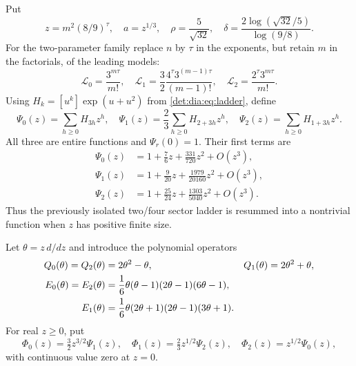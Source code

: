 \documentclass[11pt,letterpaper]{article}
\numberwithin{equation}{section}
\theoremstyle{definition}\newtheorem{definition}[theorem]{Definition}
\theoremstyle{remark}\newtheorem{remark}[theorem]{Remark}
\newcommand{\coef}[2]{[#1^{#2}]}
\begin{document}
Put
\begin{equation}\label{det:dia:eq:crossparams}
 z=m^2(8/9)^\tau,\quad a=z^{1/3},\quad
 \rho=\frac5{\sqrt{32}},\quad
 \delta=\frac{2\log(\sqrt{32}/5)}{\log(9/8)}.
\end{equation}
For the two-parameter family replace $n$ by $\tau$ in the exponents,
but retain $m$ in the factorials, of the leading models:
\begin{equation}\label{det:dia:eq:crossL}
 \mathcal L_0=\frac{3^{m\tau}}{m!},\quad
 \mathcal L_1=\frac32\frac{4^\tau3^{(m-1)\tau}}{(m-1)!},\quad
 \mathcal L_2=\frac{2^\tau3^{m\tau}}{m!}.
\end{equation}
Using $H_k=\coef{u}{k}\exp(u+u^2)$ from \eqref{det:dia:eq:ladder}, define
\begin{equation}\label{det:dia:eq:Psi}
 \Psi_0(z)=\sum_{h\geq0}H_{3h}z^h,\quad
 \Psi_1(z)=\frac23\sum_{h\geq0}H_{2+3h}z^h,\quad
 \Psi_2(z)=\sum_{h\geq0}H_{1+3h}z^h.
\end{equation}
All three are entire functions and $\Psi_r(0)=1$. Their first terms are
\begin{align*}
 \Psi_0(z)&=1+\tfrac76z+\tfrac{331}{720}z^2+O(z^3),\\
 \Psi_1(z)&=1+\tfrac9{20}z+\tfrac{1979}{20160}z^2+O(z^3),\\
 \Psi_2(z)&=1+\tfrac{25}{24}z+\tfrac{1303}{5040}z^2+O(z^3).
\end{align*}
Thus the previously isolated two/four sector ladder is resummed into a
nontrivial function when $z$ has positive finite size.

Let $\theta=z\,d/dz$ and introduce the polynomial operators
\begin{align}
 Q_0(\theta)=Q_2(\theta)&=2\theta^2-\theta,&
 Q_1(\theta)&=2\theta^2+\theta,\label{det:dia:eq:Q}\\
 E_0(\theta)=E_2(\theta)
 &=\frac16\theta(\theta-1)(2\theta-1)(6\theta-1),\notag\\
 E_1(\theta)&=\frac16\theta(2\theta+1)(2\theta-1)(3\theta+1).
 \label{det:dia:eq:E}
\end{align}
For real $z\geq0$, put
\begin{equation}\label{det:dia:eq:Phi}
 \Phi_0(z)=\tfrac32 z^{3/2}\Psi_1(z),\quad
 \Phi_1(z)=\tfrac23 z^{1/2}\Psi_2(z),\quad
 \Phi_2(z)=z^{1/2}\Psi_0(z),
\end{equation}
with continuous value zero at $z=0$.
\end{document}
